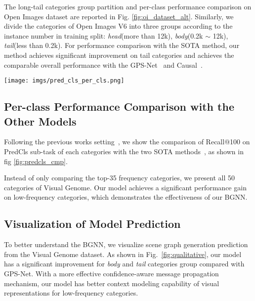 The long-tail categories group partition and per-class performance comparison on Open Images dataset are reported in Fig. \ref{fig:oi_dataset_alt}. 
Similarly, we divide the categories of Open Images V6 into three groups according to the instance number in training split: \textit{head}(more than 12k), \textit{body}(0.2k $\sim $ 12k), \textit{tail}(less than 0.2k). 
For performance comparison with the SOTA method, our method achieves significant improvement on tail categories and achieves the comparable overall performance with the GPS-Net~\cite{lin_gps-net_2020} and Causal~\cite{tang_unbiased_2020}.



\begin{figure*}
	\centering
	\texttt{[image: imgs/pred\_cls\_per\_cls.png]}
	\caption{
		 \textbf{The Recall@100 on Predicate Classification(PredCls) of all categories.} We compare with the SOTA methods: Causal~\cite{tang_unbiased_2020}, and GPS-Net~\cite{lin_gps-net_2020}.
		 $*$ denotes the re-sampling~\cite{gupta_lvis:_2019} is applied for this model.
	}
	\label{fig:predcls_cmp}
\end{figure*}


\subsection{Per-class Performance Comparison with the Other Models} \label{ppc}

Following the previous works setting~\cite{chen_knowledge-embedded_2019,tang_learning_2018, lin_gps-net_2020, tang_unbiased_2020}, we show the comparison of Recall@100 on PredCls sub-task of each categories with the two SOTA methods~\cite{lin_gps-net_2020, tang_unbiased_2020}, as shown in fig \ref{fig:predcls_cmp}.

Instead of only comparing the top-35 frequency categories, we present all 50 categories of Visual Genome. Our model achieves a significant performance gain on low-frequency categories, which demonstrates the effectiveness of our BGNN. 



\subsection{Visualization of Model Prediction} \label{visualize}
To better understand the BGNN, we visualize scene graph generation prediction from the Visual Genome dataset.
As shown in Fig.~\ref{fig:qualitative}, our model has a significant improvement for \textit{body} and \textit{tail} categories group compared with GPS-Net.
With a more effective confidence-aware message propagation mechanism, our model has better context modeling capability of visual representations for low-frequency categories.  

